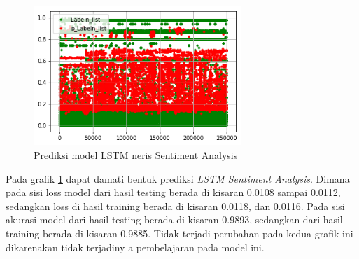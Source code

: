 \documentclass[./skripsi.tex]{subfiles}
\begin{document}
\begin{figure}%
    \centering
    \includegraphics[width=0.7\textwidth]{public/assets/img/lstms_neris_pred.png}
    \caption{Prediksi model LSTM neris Sentiment Analysis}
    \label{fig:lstms_neris_pred}
\end{figure}

\par Pada grafik \ref{fig:lstms_neris_pred} dapat damati bentuk prediksi \textit{LSTM Sentiment Analysis}. Dimana pada sisi loss model dari hasil testing berada di kisaran 0.0108 sampai 0.0112, sedangkan loss di hasil training berada di kisaran 0.0118, dan 0.0116. Pada sisi akurasi model dari hasil testing berada di kisaran 0.9893, sedangkan dari hasil training berada di kisaran 0.9885. Tidak terjadi perubahan pada kedua grafik ini dikarenakan tidak terjadiny a pembelajaran pada model ini.
\end{document}
